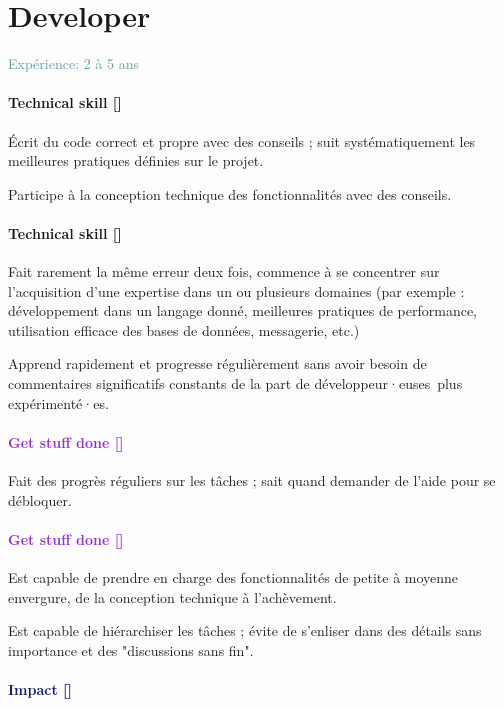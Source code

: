 \documentclass[a4paper, french, openany, 12pt]{book}
\newcommand\dex{\textcolor{BrickRed}{\textbf{Technical skill [\bsc{DEX}]}}}
\newcommand\str{\textcolor{DarkOrchid}{\textbf{Get stuff done [\bsc{STR}]}}}
\newcommand\wis{\textcolor{MidnightBlue}{\textbf{Impact [\bsc{WIS}]}}}
\newcommand\xp[1]{\textcolor{CadetBlue}{Expérience: {#1} ans}}
\newcommand\devs{développeur·euses}
\begin{document}
\chapter{Developer}

\xp{2 à 5}

\begin{multicols}{2}

  \subsubsection*{\dex}

  Écrit du code correct et propre avec des conseils ; suit systématiquement les meilleures pratiques définies sur le
  projet.

  Participe à la conception technique des fonctionnalités avec des conseils.

  \subsubsection*{\dex}

  Fait rarement la même erreur deux fois, commence à se concentrer sur l'acquisition d'une expertise dans un ou plusieurs 
  domaines (par exemple : développement dans un langage donné, meilleures pratiques de performance, utilisation efficace 
  des bases de données, messagerie, etc.)

  Apprend rapidement et progresse régulièrement sans avoir besoin de commentaires significatifs constants de la part 
  de \devs\ plus expérimenté·es.

  \subsubsection*{\str}

  Fait des progrès réguliers sur les tâches ; sait quand demander de l'aide pour se débloquer.

  \subsubsection*{\str}

  Est capable de prendre en charge des fonctionnalités de petite à moyenne envergure, de la conception technique à 
  l'achèvement.

  Est capable de hiérarchiser les tâches ; évite de s'enliser dans des détails sans importance et des "discussions sans 
  fin".

  \subsubsection*{\wis}


\end{multicols}
\end{document}
